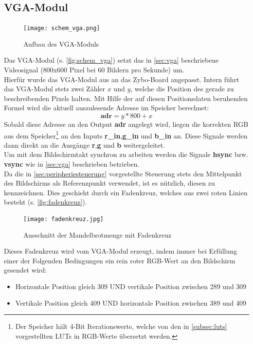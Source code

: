 \documentclass[a4paper,12pt,onesided]{report}
\begin{document}
\subsection{VGA-Modul}
\label{subsec:vga-modul}
\begin{figure}[H]
	\centering
	\texttt{[image: schem\_vga.png]}
	\caption{Aufbau des VGA-Moduls}
	\label{fig:schem_vga}
\end{figure}
Das VGA-Modul (s. \autoref{fig:schem_vga}) setzt das in \autoref{sec:vga} beschriebene Videosignal (800x600 Pixel bei 60 Bildern pro Sekunde) um.\\
Hierfür wurde das VGA-Modul aus \cite{vgagit} an das Zybo-Board angepasst.
Intern führt das VGA-Modul stets zwei Zähler $x$ und $y$, welche die Position des gerade zu beschreibenden Pixels halten.
Mit Hilfe der auf diesen Positionsdaten beruhenden Formel wird die aktuell auszulesende Adresse im Speicher berechnet:
\[\mathbf{adr}= y*800+ x\]
Sobald diese Adresse an den Output \textbf{adr} angelegt wird, liegen die korrekten RGB aus dem Speicher\footnote{Der Speicher hält 4-Bit Iterationswerte, welche von den in \autoref{subsec:luts} vorgestellten LUTs in RGB-Werte übersetzt werden.} an den Inputs \textbf{r\_in},\textbf{g\_in} und \textbf{b\_in} an.
Diese Signale werden dann direkt an die Ausgänge \textbf{r},\textbf{g} und \textbf{b} weitergeleitet.\\
Um mit dem Bildschirmtakt synchron zu arbeiten werden die Signale \textbf{hsync} bzw. \textbf{vsync} wie in \autoref{sec:vga} beschrieben betrieben.\\
Da die in \autoref{sec:peripheriesteuerung} vorgestellte Steuerung stets den Mittelpunkt des Bildschirms als Referenzpunkt verwendet, ist es nützlich, diesen zu kennzeichnen.
Dies geschieht durch ein Fadenkreuz, welches aus zwei roten Linien besteht (s. \autoref{fig:fadenkreuz}).
\begin{figure}[H]
	\centering
	\texttt{[image: fadenkreuz.jpg]}
	\caption{Ausschnitt der Mandelbrotmenge mit Fadenkreuz}
	\label{fig:fadenkreuz}
\end{figure}
Dieses Fadenkreuz wird vom VGA-Modul erzeugt, indem immer bei Erfüllung einer der Folgenden Bedingungen ein rein roter RGB-Wert an den Bildschirm gesendet wird:
\begin{itemize}
	\item Horizontale Position gleich 309 UND vertikale Position zwischen 289 und 309
	\item Vertikale Position gleich 409 UND horizontale Position zwischen 389 und 409
\end{itemize}
\end{document}
